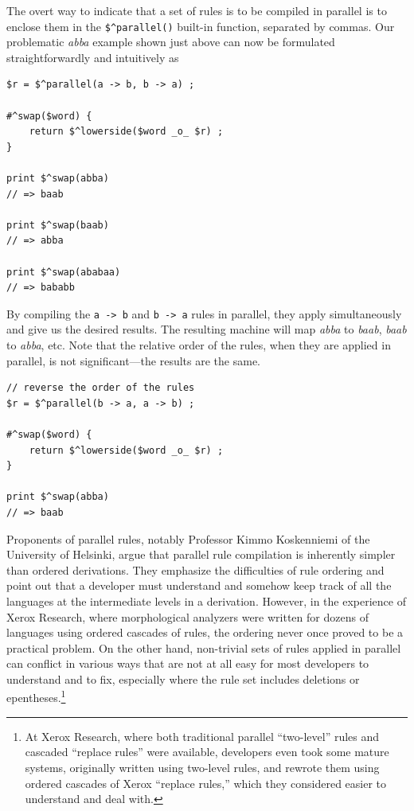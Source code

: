 The overt way to indicate that a set of rules is to be compiled in parallel is to enclose them in the \verb!$^parallel()!
built-in function, separated by commas.  Our problematic \emph{abba} example shown just above
can now be formulated straightforwardly and intuitively as

\begin{Verbatim}
$r = $^parallel(a -> b, b -> a) ;

#^swap($word) {
    return $^lowerside($word _o_ $r) ;
}

print $^swap(abba)
// => baab

print $^swap(baab)
// => abba

print $^swap(ababaa)
// => bababb
\end{Verbatim}

\noindent
By compiling the \texttt{a -> b} and \texttt{b -> a} rules in parallel, they apply simultaneously and give us the desired
results.
The resulting machine will map \emph{abba} to \emph{baab}, \emph{baab} to \emph{abba},
etc.   Note that the relative order of the rules, when they are applied in parallel,
is not significant---the results are the same.

\begin{Verbatim}
// reverse the order of the rules
$r = $^parallel(b -> a, a -> b) ;

#^swap($word) {
    return $^lowerside($word _o_ $r) ;
}

print $^swap(abba)
// => baab
\end{Verbatim}


Proponents of parallel rules, notably Professor Kimmo Koskenniemi of the University of
Helsinki, argue that parallel rule compilation is inherently simpler than ordered
derivations.  They emphasize the difficulties of rule ordering and point out that a
developer must understand and somehow keep track of all the languages at the 
intermediate levels in a
derivation.  However, in the experience of Xerox Research, where
morphological analyzers
were written for dozens of languages using ordered cascades of rules, the ordering never
once proved to be a practical problem.  
On the other hand, non-trivial sets of rules applied in parallel can conflict in
various ways that are not at all easy for most developers to understand and to fix,
especially where the rule set includes deletions or epentheses.\footnote{At Xerox
	Research, where both traditional parallel ``two-level'' rules and cascaded ``replace
	rules'' were available, developers even took some mature systems, originally written
	using two-level rules, and rewrote them using ordered cascades of Xerox ``replace
rules,'' which they considered easier to understand and deal with.}
	
